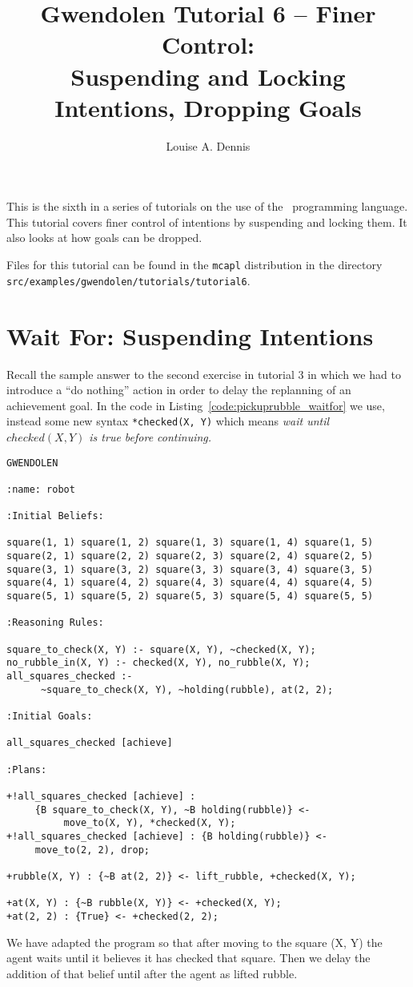 \documentclass[a4]{article}
\author{Louise A. Dennis}
\title{Gwendolen Tutorial 6 -- Finer Control: \\
Suspending and Locking Intentions, Dropping Goals}
\begin{document}
\maketitle
This is the sixth in a series of tutorials on the use of the \gwendolen\ programming language.  This tutorial covers finer control of intentions by suspending and locking them.  It also looks at how goals can be dropped.

Files for this tutorial can be found in the \texttt{mcapl} distribution in the directory \texttt{src/examples/gwendolen/tutorials/tutorial6}.

\section{Wait For: Suspending Intentions}

Recall the sample answer to the second exercise in tutorial 3 in which we had to introduce a ``do nothing'' action in order to delay the replanning of an achievement goal.  In the code in Listing~\ref{code:pickuprubble_waitfor} we use, instead some new syntax \lstinline{*checked(X, Y)} which means \emph{wait until $checked(X, Y)$ is true before continuing.}

\begin{lstlisting}[float,caption=Using Wait For,basicstyle=\sffamily,style=easslisting,language=Gwendolen,label=code:pickuprubble_waitfor]
GWENDOLEN

:name: robot

:Initial Beliefs:

square(1, 1) square(1, 2) square(1, 3) square(1, 4) square(1, 5)
square(2, 1) square(2, 2) square(2, 3) square(2, 4) square(2, 5)
square(3, 1) square(3, 2) square(3, 3) square(3, 4) square(3, 5)
square(4, 1) square(4, 2) square(4, 3) square(4, 4) square(4, 5)
square(5, 1) square(5, 2) square(5, 3) square(5, 4) square(5, 5)

:Reasoning Rules:

square_to_check(X, Y) :- square(X, Y), ~checked(X, Y);
no_rubble_in(X, Y) :- checked(X, Y), no_rubble(X, Y);
all_squares_checked :-
      ~square_to_check(X, Y), ~holding(rubble), at(2, 2);

:Initial Goals:

all_squares_checked [achieve]

:Plans:

+!all_squares_checked [achieve] : 
     {B square_to_check(X, Y), ~B holding(rubble)} <- 
          move_to(X, Y), *checked(X, Y);
+!all_squares_checked [achieve] : {B holding(rubble)} <- 
     move_to(2, 2), drop;

+rubble(X, Y) : {~B at(2, 2)} <- lift_rubble, +checked(X, Y);

+at(X, Y) : {~B rubble(X, Y)} <- +checked(X, Y);
+at(2, 2) : {True} <- +checked(2, 2);
\end{lstlisting}
We have adapted the program so that after moving to the square (X, Y) the agent waits until it believes it has checked that square.  Then we delay the addition of that belief until after the agent as lifted rubble.
\end{document}

